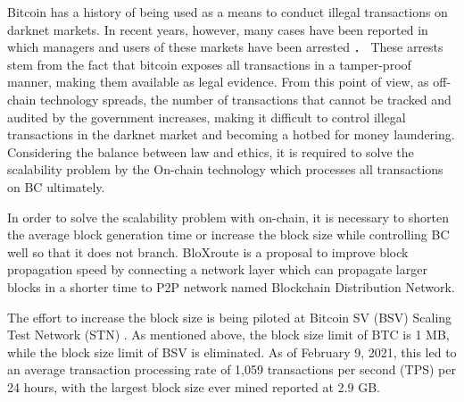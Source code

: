 \documentclass[graybox]{svmult}
\begin{document}
Bitcoin has a history of being used as a means to conduct illegal transactions on darknet markets.
In recent years, however, many cases have been reported in which managers and users of these markets have been arrested \cite{silkroad,alphabay,welcome2video}．
These arrests stem from the fact that bitcoin exposes all transactions in a tamper-proof manner, making them available as legal evidence.
From this point of view, as off-chain technology spreads, the number of transactions that cannot be tracked and audited by the government increases, making it difficult to control illegal transactions in the darknet market and becoming a hotbed for money laundering.
Considering the balance between law and ethics, it is required to solve the scalability problem by the On-chain technology which processes all transactions on BC ultimately.


In order to solve the scalability problem with on-chain, it is necessary to shorten the average block generation time or increase the block size while controlling BC well so that it does not branch.
BloXroute\cite{bloX} is a proposal to improve block propagation speed by connecting a network layer which can propagate larger blocks in a shorter time to P2P network named Blockchain Distribution Network.


The effort to increase the block size is being piloted at Bitcoin SV (BSV) \cite{bsv} Scaling Test Network (STN) \cite{bitcoinscaling}.
As mentioned above, the block size limit of BTC is 1 MB, while the block size limit of BSV is eliminated.
As of February 9, 2021, this led to an average transaction processing rate of 1,059 transactions per second (TPS) per 24 hours, with the largest block size ever mined reported at 2.9 GB.
\end{document}
